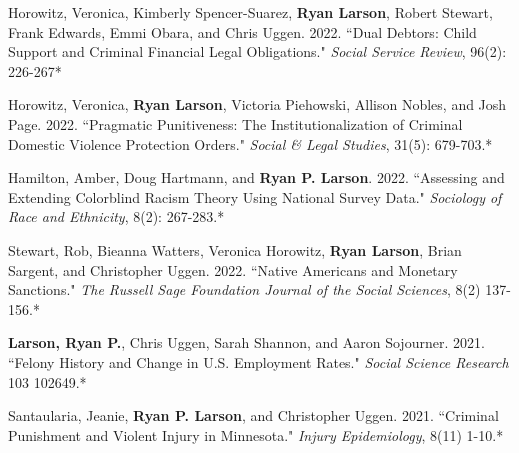\documentclass[letterpaper]{article}
\renewenvironment{itemize}{
  \begin{list}{}{
    \setlength{\leftmargin}{1.5em}
  }
}{
  \end{list}
}
\begin{document}
\begin{itemize}
\item Horowitz, Veronica, Kimberly Spencer-Suarez, \textbf{Ryan Larson}, Robert Stewart, Frank Edwards, Emmi Obara, and Chris Uggen. 2022. ``Dual Debtors: Child Support and Criminal Financial Legal Obligations." \textit{Social Service Review}, 96(2): 226-267*

\item Horowitz, Veronica,  \textbf{Ryan Larson}, Victoria Piehowski, Allison Nobles, and Josh Page. 2022. ``Pragmatic Punitiveness: The Institutionalization of Criminal Domestic Violence Protection Orders." \textit{Social \& Legal Studies}, 31(5): 679-703.*

\item Hamilton, Amber, Doug Hartmann, and \textbf{Ryan P. Larson}. 2022. ``Assessing and Extending Colorblind Racism Theory Using National Survey Data." \textit{Sociology of Race and Ethnicity}, 8(2): 267-283.*

\item Stewart, Rob, Bieanna Watters, Veronica Horowitz, \textbf{Ryan Larson}, Brian Sargent, and Christopher Uggen. 2022. ``Native Americans and Monetary Sanctions." \textit{The Russell Sage Foundation Journal of the Social Sciences}, 8(2) 137-156.*

\item  \textbf{Larson, Ryan P.}, Chris Uggen, Sarah Shannon, and Aaron Sojourner. 2021. ``Felony History and Change in U.S. Employment Rates." \textit{Social Science Research} 103 102649.*

\item  Santaularia, Jeanie, \textbf{Ryan P. Larson}, and Christopher Uggen. 2021. ``Criminal Punishment and Violent Injury in Minnesota." \textit{Injury Epidemiology}, 8(11) 1-10.*


\end{itemize}
\end{document}
